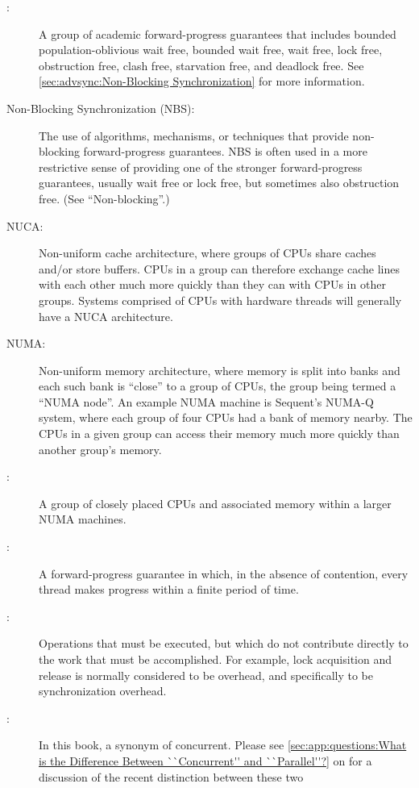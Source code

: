 \begin{description}
\item[:]
	A group of academic forward-progress guarantees that includes
	bounded population-oblivious wait free,
	bounded wait free,
	wait free,
	lock free,
	obstruction free,
	clash free,
	starvation free, and
	deadlock free.
	See \cref{sec:advsync:Non-Blocking Synchronization}
	for more information.
\item[Non-Blocking Synchronization (NBS):]
	The use of algorithms, mechanisms, or techniques that provide
	non-blocking forward-progress guarantees.
	NBS is often used in a more restrictive sense of providing one
	of the stronger forward-progress guarantees, usually wait free or
	lock free, but sometimes also obstruction free.
	(See ``Non-blocking''.)
\item[NUCA:]
	Non-uniform cache architecture, where groups of CPUs share
	caches and/or store buffers.
	CPUs in a group can therefore exchange cache lines with each
	other much more quickly than they can with CPUs in other groups.
	Systems comprised of CPUs with hardware threads will generally
	have a NUCA architecture.
\item[NUMA:]
	Non-uniform memory architecture, where memory is split into
	banks and each such bank is ``close'' to a group of CPUs,
	the group being termed a ``NUMA node''.
	An example NUMA machine is Sequent's NUMA-Q system, where
	each group of four CPUs had a bank of memory nearby.
	The CPUs in a given group can access their memory much
	more quickly than another group's memory.
\item[:]
	A group of closely placed CPUs and associated memory within
	a larger NUMA machines.
\item[:]
	A forward-progress guarantee in which, in the absence of
	contention, every thread makes progress within a finite
	period of time.
\item[:]
	Operations that must be executed, but which do not contribute
	directly to the work that must be accomplished.
	For example, lock acquisition and release is normally considered
	to be overhead, and specifically to be synchronization overhead.
\item[:]
	In this book, a synonym of concurrent.
	Please see \cref{sec:app:questions:What is the Difference Between ``Concurrent'' and ``Parallel''?}
	on 
	for a discussion of the recent distinction between these two

\end{description}
